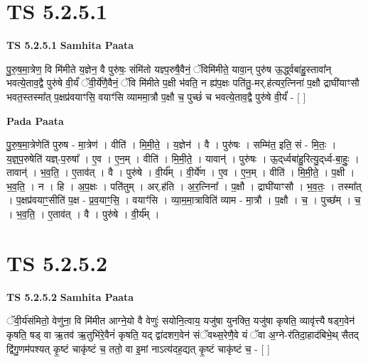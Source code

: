 \documentclass[17pt]{extarticle}
\begin{document}

\section{ TS 5.2.5.1 }

\textbf{TS 5.2.5.1 } \newline
\textbf{Samhita Paata} \newline

पु॒रु॒ष॒मा॒त्रेण॒ वि मि॑मीते य॒ज्ञेन॒ वै पुरु॑षः॒ संमि॑तो यज्ञ्प॒रुषै॒वैनं॒ ॅविमि॑मीते॒ यावा॒न् पुरु॑ष ऊ॒र्द्ध्वबा॑हु॒स्तावा᳚न् भवत्ये॒ताव॒द्वै पुरु॑षे वी॒र्यं॑ ॅवी॒र्ये॑णै॒वैनं॒ ॅवि मि॑मीते प॒क्षी भ॑वति॒ न ह्य॑प॒क्षः पति॑तु॒-मर्.ह॑त्यर॒त्निना॑ प॒क्षौ द्राघी॑याꣳसौ भवत॒स्तस्मा᳚त् प॒क्षप्र॑वयाꣳसि॒ वयाꣳ॑सि व्याममा॒त्रौ प॒क्षौ च॒ पुच्छं॑ च भवत्ये॒ताव॒द्वै पुरु॑षे वी॒र्यं॑ - [  ] \newline

\textbf{Pada Paata} \newline

पु॒रु॒ष॒मा॒त्रेणेति॑ पुरुष - मा॒त्रेण॑ । वीति॑ । मि॒मी॒ते॒ । य॒ज्ञेन॑ । वै । पुरु॑षः । सम्मि॑त॒ इति॒ सं - मि॒तः॒ । य॒ज्ञ्॒प॒रुषेति॑ यज्ञ्-प॒रुषा᳚ । ए॒व । ए॒न॒म् । वीति॑ । मि॒मी॒ते॒ । यावान्॑ । पुरु॑षः । ऊ॒द्‌र्ध्वबा॑हु॒रित्यु॒द्‌र्ध्व-बा॒हुः॒ । तावान्॑ । भ॒व॒ति॒ । ए॒ताव॑त् । वै । पुरु॑षे । वी॒र्य᳚म् । वी॒र्ये॑ण । ए॒व । ए॒न॒म् । वीति॑ । मि॒मी॒ते॒ । प॒क्षी । भ॒व॒ति॒ । न । हि । अ॒प॒क्षः । पति॑तुम् । अर्.ह॑ति । अ॒र॒त्निना᳚ । प॒क्षौ । द्राघी॑याꣳसौ । भ॒व॒तः॒ । तस्मा᳚त् । प॒क्षप्र॑वयाꣳ॒॒सीति॑ प॒क्ष - प्र॒व॒याꣳ॒॒सि॒ । वयाꣳ॑सि । व्या॒म॒मा॒त्राविति॑ व्याम - मा॒त्रौ । प॒क्षौ । च॒ । पुच्छ᳚म् । च॒ । भ॒व॒ति॒ । ए॒ताव॑त् । वै । पुरु॑षे । वी॒र्य᳚म् ।  \newline





\section{ TS 5.2.5.2 }

\textbf{TS 5.2.5.2 } \newline
\textbf{Samhita Paata} \newline

ॅवी॒र्य॑संमितो॒ वेणु॑ना॒ वि मि॑मीत आग्ने॒यो वै वेणुः॑ सयोनि॒त्वाय॒ यजु॑षा युनक्ति॒ यजु॑षा कृषति॒ व्यावृ॑त्त्यै षड्ग॒वेन॑ कृषति॒ षड् वा ऋ॒तव॑ ऋ॒तुभि॑रे॒वैनं॑ कृषति॒ यद् द्वा॑दशग॒वेन॑ संॅवथ्स॒रेणै॒वे यं ॅवा अ॒ग्ने-र॑तिदा॒हाद॑बिभे॒थ् सैतद् द्वि॑गु॒णम॑पश्यत् कृ॒ष्टं चाकृ॑ष्टं च॒ ततो॒ वा इ॒मां नाऽत्य॑दह॒द्यत् कृ॒ष्टं चाकृ॑ष्टं च॒ - [  ] \newline
\end{document}
